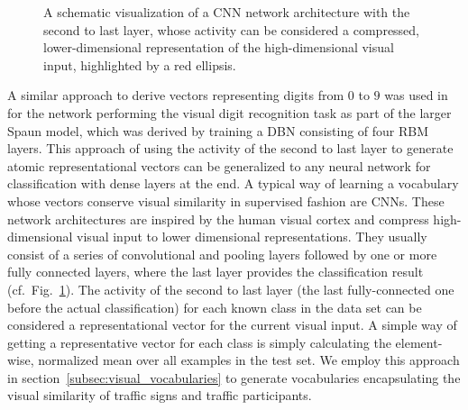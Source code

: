 \begin{figure}[t]
	\centering
	\caption{A schematic visualization of a \ac{CNN} network architecture with the second to last layer, whose activity can be considered a compressed, lower-dimensional representation of the high-dimensional visual input, highlighted by a red ellipsis.}
	\label{fig:cnn_arch}
\end{figure}

A similar approach to derive vectors representing digits from $0$ to $9$ was used in \textcite{Eliasmith2012} for the network performing the visual digit recognition task as part of the larger \ac{Spaun} model, which was derived by training a \ac{DBN} consisting of four \acl{RBM} layers.
This approach of using the activity of the second to last layer to generate atomic representational vectors can be generalized to any neural network for classification with dense layers at the end.
A typical way of learning a vocabulary whose vectors conserve visual similarity in supervised fashion are \acp{CNN}.
These network architectures are inspired by the human visual cortex and compress high-dimensional visual input to lower dimensional representations.
They usually consist of a series of convolutional and pooling layers followed by one or more fully connected layers, where the last layer provides the classification result (cf.\ Fig.~\ref{fig:cnn_arch}).
The activity of the second to last layer (the last fully-connected one before the actual classification) for each known class in the data set can be considered a representational vector for the current visual input.
A simple way of getting a representative vector for each class is simply calculating the element-wise, normalized mean over all examples in the test set.
We employ this approach in section~\ref{subsec:visual_vocabularies} to generate vocabularies encapsulating the visual similarity of traffic signs and traffic participants.

